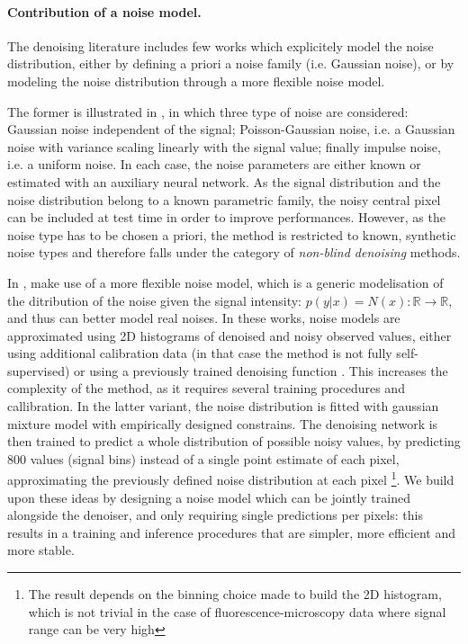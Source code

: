 \documentclass{article}
\begin{document}
\paragraph{Contribution of a noise model.}
The denoising literature includes few works which explicitely model the noise distribution, either by defining a priori a noise family (i.e. Gaussian noise), or by modeling the noise distribution through a more flexible noise model.

The former is illustrated in \cite{laine2019high}, in which three type of noise are considered: Gaussian noise independent of the signal; Poisson-Gaussian noise, i.e. a Gaussian noise with variance scaling linearly with the signal value; finally impulse noise, i.e. a uniform noise. In each case, the noise parameters are either known or estimated with an auxiliary neural network. As the signal distribution and the noise distribution belong to a known parametric family, the noisy central pixel can be included at test time in order to improve performances. However, as the noise type has to be chosen a priori, the method is restricted to known, synthetic noise types and therefore falls under the category of \textit{non-blind denoising} methods.

In \cite{krull2019probabilistic,prakash2020fully,2020DivNoising}, make use of a more flexible noise model, which is a generic modelisation of the ditribution of the noise given the signal intensity: $p(y|x) = N(x): \mathbb{R} \to \mathbb{R}$, and thus can better model real noises.
In these works, noise models are approximated using 2D histograms of denoised and noisy observed values, either using additional calibration data (in that case the method is not fully self-supervised) or using a previously trained denoising function \cite{prakash2020fully}. This increases the complexity of the method, as it requires several training procedures and callibration. In the latter variant, the noise distribution is fitted with gaussian mixture model with empirically designed constrains.
The denoising network is then trained to predict a whole distribution of possible noisy values, by predicting $800$ values (signal bins) instead of a single point estimate of each pixel, approximating the previously defined noise distribution at each pixel \footnote{The result depends on the binning choice made to build the 2D histogram, which is not trivial in the case of fluorescence-microscopy data where signal range can be very high}.
We build upon these ideas by designing a noise model which can be jointly trained alongside the denoiser, and only requiring single predictions per pixels: this results in a training and inference procedures that are simpler, more efficient and more stable.
\end{document}
